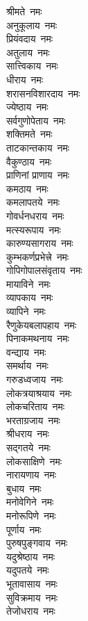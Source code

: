\begin{multicols}{2}
\begin{flushleft}
श्रीमते~नमः\\
अनुकूलाय~नमः\\
प्रियंवदाय~नमः\\
अतुलाय~नमः\\
सात्त्विकाय~नमः\\
धीराय~नमः\\
शरासनविशारदाय~नमः\\
ज्येष्ठाय~नमः\\
सर्वगुणोपेताय~नमः\hfill{}\\
शक्तिमते~नमः\\
ताटकान्तकाय~नमः\\
वैकुण्ठाय~नमः\\
प्राणिनां प्राणाय~नमः\\
कमठाय~नमः\\
कमलापतये~नमः\\
गोवर्धनधराय~नमः\\
मत्स्यरूपाय~नमः\\
कारुण्यसागराय~नमः\\
कुम्भकर्णप्रभेत्त्रे~नमः\hfill{}\\
गोपिगोपालसंवृताय~नमः\\
मायाविने~नमः\\
व्यापकाय~नमः\\
व्यापिने~नमः\\
रैणुकेयबलापहाय~नमः\\
पिनाकमथनाय~नमः\\
वन्द्याय~नमः\\
समर्थाय~नमः\\
गरुडध्वजाय~नमः\\
लोकत्रयाश्रयाय~नमः\hfill{}\\
लोकचरिताय~नमः\\
भरताग्रजाय~नमः\\
श्रीधराय~नमः\\
सद्गतये~नमः\\
लोकसाक्षिणे~नमः\\
नारायणाय~नमः\\
बुधाय~नमः\\
मनोवेगिने~नमः\\
मनोरूपिणे~नमः\\
पूर्णाय~नमः\hfill{}\\
पुरुषपुङ्गवाय~नमः\\
यदुश्रेष्ठाय~नमः\\
यदुपतये~नमः\\
भूतावासाय~नमः\\
सुविक्रमाय~नमः\\
तेजोधराय~नमः\\

\end{flushleft}
\end{multicols}
